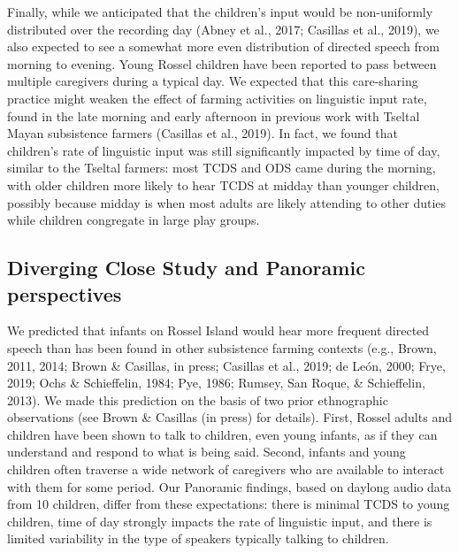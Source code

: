 \documentclass[,man,floatsintext]{apa6}
\begin{document}
Finally, while we anticipated that the children's input would be
non-uniformly distributed over the recording day (Abney et al., 2017;
Casillas et al., 2019), we also expected to see a somewhat more even
distribution of directed speech from morning to evening. Young Rossel
children have been reported to pass between multiple caregivers during a
typical day. We expected that this care-sharing practice might weaken
the effect of farming activities on linguistic input rate, found in the
late morning and early afternoon in previous work with Tseltal Mayan
subsistence farmers (Casillas et al., 2019). In fact, we found that
children's rate of linguistic input was still significantly impacted by
time of day, similar to the Tseltal farmers: most TCDS and ODS came
during the morning, with older children more likely to hear TCDS at
midday than younger children, possibly because midday is when most
adults are likely attending to other duties while children congregate in
large play groups.

\subsection{Diverging Close Study and Panoramic
perspectives}\label{diverging-close-study-and-panoramic-perspectives}

We predicted that infants on Rossel Island would hear more frequent
directed speech than has been found in other subsistence farming
contexts (e.g., Brown, 2011, 2014; Brown \& Casillas, in press; Casillas
et al., 2019; de León, 2000; Frye, 2019; Ochs \& Schieffelin, 1984; Pye,
1986; Rumsey, San Roque, \& Schieffelin, 2013). We made this prediction
on the basis of two prior ethnographic observations (see Brown \&
Casillas (in press) for details). First, Rossel adults and children have
been shown to talk to children, even young infants, as if they can
understand and respond to what is being said. Second, infants and young
children often traverse a wide network of caregivers who are available
to interact with them for some period. Our Panoramic findings, based on
daylong audio data from 10 children, differ from these expectations:
there is minimal TCDS to young children, time of day strongly impacts
the rate of linguistic input, and there is limited variability in the
type of speakers typically talking to children.
\end{document}
